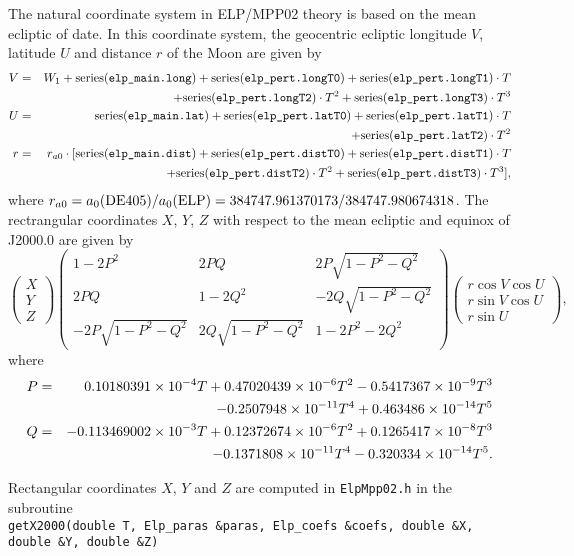 \documentclass[12pt]{article}
\newcommand \beq {\begin{equation}}
\newcommand \eeq {\end{equation}}
\newcommand \beqn {\begin{eqnarray}}
\newcommand \eeqn {\end{eqnarray}}
\begin{document}
The natural coordinate system in ELP/MPP02 theory is based on the mean ecliptic 
of date. In this coordinate system, the geocentric ecliptic longitude $V$, 
latitude $U$ and distance $r$ of the Moon are given by 
\beqn
  V &=& W_1 + \mbox{series({\tt elp\_main.long})} + \mbox{series({\tt elp\_pert.longT0})} + 
\mbox{series({\tt elp\_pert.longT1})}\cdot T \cr 
&&+ \mbox{series({\tt elp\_pert.longT2})}\cdot T^2 + \mbox{series({\tt elp\_pert.longT3})}\cdot T^3 \\
  U &=& \mbox{series({\tt elp\_main.lat})} + \mbox{series({\tt elp\_pert.latT0})} +
\mbox{series({\tt elp\_pert.latT1})}\cdot T \cr
&&+ \mbox{series({\tt elp\_pert.latT2})}\cdot T^2 \\ 
  r &=& r_{a0} \cdot [\mbox{series({\tt elp\_main.dist})} + \mbox{series({\tt elp\_pert.distT0})} +
\mbox{series({\tt elp\_pert.distT1})}\cdot T \cr
&&+ \mbox{series({\tt elp\_pert.distT2})}\cdot T^2 + \mbox{series({\tt elp\_pert.distT3})}\cdot T^3] ,
\eeqn
where $r_{a0}=a_0({\rm DE405})/a_0({\rm ELP}) = 384747.961370173/384747.980674318$. 
The rectrangular coordinates $X$, $Y$, $Z$ with respect to the mean ecliptic and equinox 
of J2000.0 are given by
\beq
\left( \begin{array}{c} X \\ Y \\ Z\end{array}\right)
  \left( \begin{array}{ccc} 
1-2P^2 & 2PQ & 2P\sqrt{1-P^2-Q^2} \\ 
2PQ & 1-2Q^2 & -2Q\sqrt{1-P^2-Q^2} \\ 
-2P\sqrt{1-P^2-Q^2}  & 2Q\sqrt{1-P^2-Q^2} & 1-2P^2-2Q^2 \end{array}\right)
\left( \begin{array}{c} r \cos V \cos U \\ r \sin V \cos U \\ r \sin U \end{array}\right) ,
\eeq
where
\beqn
  P &=& 0.10180391 \times 10^{-4} T + 0.47020439\times 10^{-6} T^2 
- 0.5417367\times 10^{-9} T^3 \cr 
&& - 0.2507948\times 10^{-11} T^4 + 0.463486\times 10^{-14} T^5 \\ 
  Q &=& -0.113469002\times 10^{-3} T + 0.12372674\times 10^{-6} T^2 
+ 0.1265417\times 10^{-8} T^3 \cr 
&& - 0.1371808\times 10^{-11} T^4 - 0.320334\times 10^{-14} T^5 .
\eeqn

Rectangular coordinates $X$, $Y$ and $Z$ are computed in {\tt ElpMpp02.h} 
in the subroutine \\
{\tt getX2000(double T,  Elp\_paras \&paras, Elp\_coefs \&coefs,
              double \&X, double \&Y, double \&Z)}
\end{document}
